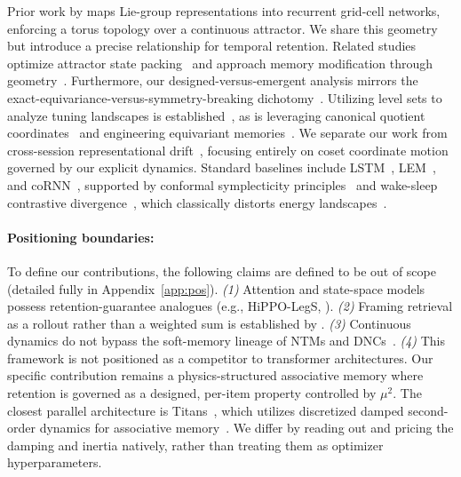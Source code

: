 \documentclass[mlabstract,onecolumn]{jmlr}
\begin{document}
Prior work by \citet{xu_conformal_2022} maps Lie-group representations into recurrent grid-cell networks, enforcing a torus topology over a continuous attractor. We share this geometry but introduce a precise relationship for temporal retention. Related studies optimize attractor state packing~\citep{vastola_optimal_2025} and approach memory modification through geometry~\citep{donmez_discovering_2024}. Furthermore, our designed-versus-emergent analysis mirrors the exact-equivariance-versus-symmetry-breaking dichotomy~\citep{vanderouderaa_sparse_2023,iqbal_spontaneous_2026}. Utilizing level sets to analyze tuning landscapes is established~\citep{akhtiamov_connectedness_2023,wang_level_2022}, as is leveraging canonical quotient coordinates~\citep{aslan_group_2022} and engineering equivariant memories~\citep{bernardo_shaping_2025}. We separate our work from cross-session representational drift~\citep{driscoll_dynamic_2017,aitken_geometry_2022,jude_capturing_2023}, focusing entirely on coset coordinate motion governed by our explicit dynamics. Standard baselines include LSTM~\citep{hochreiter_long_1997}, LEM~\citep{rusch_long_2022}, and coRNN~\citep{rusch_coupled_2021}, supported by conformal symplecticity principles~\citep{mclachlan_conformal_2001} and wake-sleep contrastive divergence~\citep{hinton_wake-sleep_1995,tieleman_training_2008}, which classically distorts energy landscapes~\citep{fischer_empirical_2010,nijkamp_anatomy_2020}.

\paragraph{Positioning boundaries:} To define our contributions, the following claims are defined to be out of scope (detailed fully in Appendix~\ref{app:pos}). \emph{(1)} Attention and state-space models possess retention-guarantee analogues (e.g., HiPPO-LegS, \citealp{gu_hippo_2020,jelassi_repeat_2024}). \emph{(2)} Framing retrieval as a rollout rather than a weighted sum is established by \citet{kong_reservoir-computing_2024}. \emph{(3)} Continuous dynamics do not bypass the soft-memory lineage of NTMs and DNCs~\citep{graves_neural_2014,graves_hybrid_2016,csords_improving_2019}. \emph{(4)} This framework is not positioned as a competitor to transformer architectures. Our specific contribution remains a physics-structured associative memory where retention is governed as a designed, per-item property controlled by $\mu^2$. The closest parallel architecture is Titans~\citep{behrouz_titans_2024}, which utilizes discretized damped second-order dynamics for associative memory~\citep{karuvally_exponential_2025,ramsauer_hopfield_2020}. We differ by reading out and pricing the damping and inertia natively, rather than treating them as optimizer hyperparameters.
\end{document}
